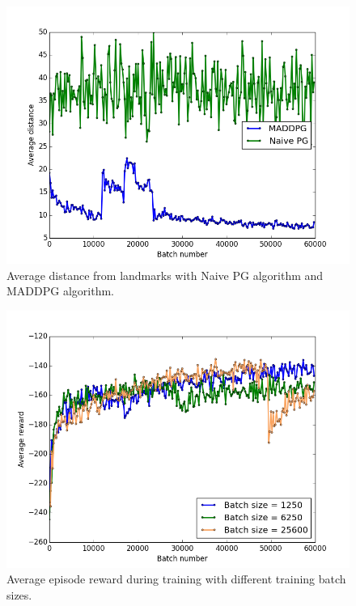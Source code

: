 \documentclass{article}
\begin{document}
\begin{figure}
\begin{center}
\includegraphics[scale=0.4]{MADDPGvsPG_distance}
\end{center}
\caption{Average distance from landmarks with Naive PG algorithm and MADDPG algorithm.}
\label{fig:MADDPGvsPG_distance}
\end{figure}

\begin{figure}
\begin{center}
\includegraphics[scale=0.35]{batch_size}
\end{center}
\caption{Average episode reward during training with different training batch sizes.}
\label{fig:batch_size}
\end{figure}
\end{document}
